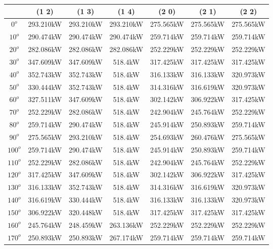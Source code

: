         \begin{table}[H]
        	\centering
        	\begin{tabular}{|c|c|c|c|c|c|c|} \hline
        			& (1 2)		& (1 3)		& (1 4)		& (2 0)		& (2 1)		& (2 2)		\\ \hline
		$0^o$	& 293.210kW	& 293.210kW	& 293.210kW	& 275.565kW	& 275.565kW	& 275.565kW	\\ \hline
		$10^o$	& 290.474kW	& 290.474kW	& 290.474kW	& 259.714kW	& 259.714kW	& 259.714kW	\\ \hline
		$20^o$	& 282.086kW	& 282.086kW	& 282.086kW	& 252.229kW	& 252.229kW	& 252.229kW	\\ \hline
		$30^o$	& 347.609kW	& 347.609kW	& 518.4kW	& 317.425kW	& 317.425kW	& 317.425kW	\\ \hline
		$40^o$	& 352.743kW	& 352.743kW	& 518.4kW	& 316.133kW	& 316.133kW	& 320.973kW	\\ \hline
		$50^o$	& 330.444kW	& 352.743kW	& 518.4kW	& 314.316kW	& 316.619kW	& 320.973kW	\\ \hline
		$60^o$	& 327.511kW	& 347.609kW	& 518.4kW	& 302.142kW	& 306.922kW	& 317.425kW	\\ \hline
		$70^o$	& 252.229kW	& 282.086kW	& 518.4kW	& 242.904kW	& 245.764kW	& 252.229kW	\\ \hline
		$80^o$	& 259.714kW	& 290.474kW	& 518.4kW	& 245.914kW	& 250.893kW	& 259.714kW	\\ \hline
		$90^o$	& 275.565kW	& 293.210kW	& 518.4kW	& 254.693kW	& 260.476kW	& 275.565kW	\\ \hline
		$100^o$	& 259.714kW	& 290.474kW	& 518.4kW	& 245.914kW	& 250.893kW	& 259.714kW	\\ \hline
		$110^o$	& 252.229kW	& 282.086kW	& 518.4kW	& 242.904kW	& 245.764kW	& 252.229kW	\\ \hline
		$120^o$	& 317.425kW	& 347.609kW	& 518.4kW	& 302.142kW	& 306.922kW	& 317.425kW	\\ \hline
		$130^o$	& 316.133kW	& 352.743kW	& 518.4kW	& 314.316kW	& 316.619kW	& 320.973kW	\\ \hline
		$140^o$	& 316.619kW	& 330.444kW	& 518.4kW	& 316.133kW	& 316.133kW	& 320.973kW	\\ \hline
		$150^o$	& 306.922kW	& 320.448kW	& 518.4kW	& 317.425kW	& 317.425kW	& 317.425kW	\\ \hline
		$160^o$	& 245.764kW	& 248.459kW	& 263.136kW	& 252.229kW	& 252.229kW	& 252.229kW	\\ \hline
		$170^o$	& 250.893kW	& 250.893kW	& 267.174kW	& 259.714kW	& 259.714kW	& 259.714kW	\\ \hline

\end{tabular}
\end{table}
